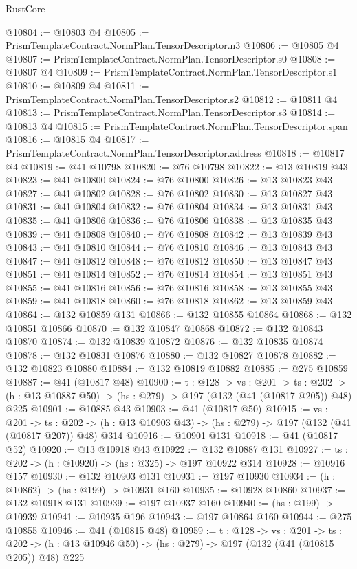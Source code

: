 \begin{lexlean}{RustCore}
\begin{coremodule}
@10804 := @10803 @4
@10805 := PrismTemplateContract.NormPlan.TensorDescriptor.n3
@10806 := @10805 @4
@10807 := PrismTemplateContract.NormPlan.TensorDescriptor.s0
@10808 := @10807 @4
@10809 := PrismTemplateContract.NormPlan.TensorDescriptor.s1
@10810 := @10809 @4
@10811 := PrismTemplateContract.NormPlan.TensorDescriptor.s2
@10812 := @10811 @4
@10813 := PrismTemplateContract.NormPlan.TensorDescriptor.s3
@10814 := @10813 @4
@10815 := PrismTemplateContract.NormPlan.TensorDescriptor.span
@10816 := @10815 @4
@10817 := PrismTemplateContract.NormPlan.TensorDescriptor.address
@10818 := @10817 @4
@10819 := @41 @10798
@10820 := @76 @10798
@10822 := @13 @10819 @43
@10823 := @41 @10800
@10824 := @76 @10800
@10826 := @13 @10823 @43
@10827 := @41 @10802
@10828 := @76 @10802
@10830 := @13 @10827 @43
@10831 := @41 @10804
@10832 := @76 @10804
@10834 := @13 @10831 @43
@10835 := @41 @10806
@10836 := @76 @10806
@10838 := @13 @10835 @43
@10839 := @41 @10808
@10840 := @76 @10808
@10842 := @13 @10839 @43
@10843 := @41 @10810
@10844 := @76 @10810
@10846 := @13 @10843 @43
@10847 := @41 @10812
@10848 := @76 @10812
@10850 := @13 @10847 @43
@10851 := @41 @10814
@10852 := @76 @10814
@10854 := @13 @10851 @43
@10855 := @41 @10816
@10856 := @76 @10816
@10858 := @13 @10855 @43
@10859 := @41 @10818
@10860 := @76 @10818
@10862 := @13 @10859 @43
@10864 := @132 @10859 @131
@10866 := @132 @10855 @10864
@10868 := @132 @10851 @10866
@10870 := @132 @10847 @10868
@10872 := @132 @10843 @10870
@10874 := @132 @10839 @10872
@10876 := @132 @10835 @10874
@10878 := @132 @10831 @10876
@10880 := @132 @10827 @10878
@10882 := @132 @10823 @10880
@10884 := @132 @10819 @10882
@10885 := @275 @10859
@10887 := @41 (@10817 @48)
@10900 := {t : @128} ->
  {vs : @201} ->
  {ts : @202} -> (h : @13 @10887 @50) -> (hs : @279) -> @197 (@132 (@41 (@10817 @205)) @48) @225
@10901 := @10885 @43
@10903 := @41 (@10817 @50)
@10915 := {vs : @201} ->
  {ts : @202} -> (h : @13 @10903 @43) -> (hs : @279) -> @197 (@132 (@41 (@10817 @207)) @48) @314
@10916 := @10901 @131
@10918 := @41 (@10817 @52)
@10920 := @13 @10918 @43
@10922 := @132 @10887 @131
@10927 := {ts : @202} -> (h : @10920) -> (hs : @325) -> @197 @10922 @314
@10928 := @10916 @157
@10930 := @132 @10903 @131
@10931 := @197 @10930
@10934 := (h : @10862) -> (hs : @199) -> @10931 @160
@10935 := @10928 @10860
@10937 := @132 @10918 @131
@10939 := @197 @10937 @160
@10940 := (hs : @199) -> @10939
@10941 := @10935 @196
@10943 := @197 @10864 @160
@10944 := @275 @10855
@10946 := @41 (@10815 @48)
@10959 := {t : @128} ->
  {vs : @201} ->
  {ts : @202} -> (h : @13 @10946 @50) -> (hs : @279) -> @197 (@132 (@41 (@10815 @205)) @48) @225

\end{coremodule}
\end{lexlean}
